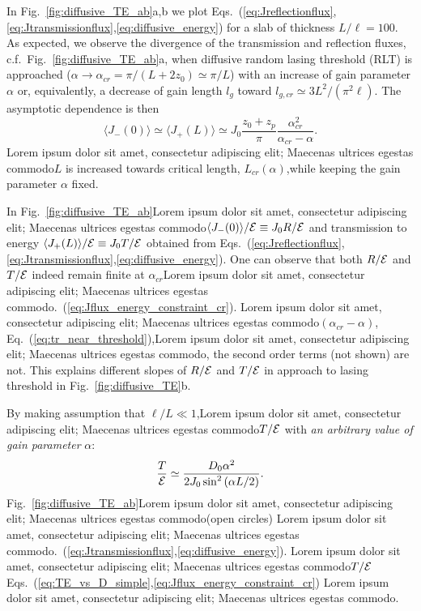 In Fig.~\ref{fig:diffusive_TE_ab}a,b we plot Eqs.~(\ref{eq:Jreflectionflux},\ref{eq:Jtransmissionflux},\ref{eq:diffusive_energy}) for a slab of thickness $L/\ell=100$. As expected, we observe the divergence of the transmission and reflection fluxes, c.f.~Fig.~\ref{fig:diffusive_TE_ab}a, when diffusive random lasing threshold (RLT) is approached ($\alpha\rightarrow\alpha_{cr}=\pi/(L+2z_0)\simeq \pi/L$) with an increase of gain parameter $\alpha$ or, equivalently, a decrease of gain length $l_g$ toward $l_{g,cr}\simeq 3L^2/(\pi^2\ell)$. The asymptotic dependence is then
\begin{equation}
\langle J_- (0)\rangle \simeq \langle J_+ (L)\rangle \simeq J_0\frac{z_0 +
z_p}{\pi} \frac{\alpha_{cr} ^2}{\alpha_{cr} -\alpha}.
\label{eq:tr_near_threshold}
\end{equation}
Lorem ipsum dolor sit amet, consectetur adipiscing elit; Maecenas ultrices egestas commodo$L$ is increased towards critical length, $L_{cr}(\alpha)$,while keeping the gain parameter $\alpha$ fixed.

In Fig.~\ref{fig:diffusive_TE_ab}Lorem ipsum dolor sit amet, consectetur adipiscing elit; Maecenas ultrices egestas commodo$\langle J_- (0)\rangle /{\cal E}\equiv J_0R/{\cal E}$ and transmission to energy $\langle J_+ (L)\rangle /{\cal E}\equiv J_0T/{\cal E}$ obtained from Eqs.~(\ref{eq:Jreflectionflux},\ref{eq:Jtransmissionflux},\ref{eq:diffusive_energy}). One can observe that both $R/{\cal E}$ and $T/{\cal E}$ indeed remain finite at $\alpha_{cr}$Lorem ipsum dolor sit amet, consectetur adipiscing elit; Maecenas ultrices egestas commodo.~(\ref{eq:Jflux_energy_constraint_cr}). Lorem ipsum dolor sit amet, consectetur adipiscing elit; Maecenas ultrices egestas commodo$(\alpha_{cr} -\alpha )$, Eq.~(\ref{eq:tr_near_threshold}),Lorem ipsum dolor sit amet, consectetur adipiscing elit; Maecenas ultrices egestas commodo, the second order terms (not shown) are not. This explains different slopes of $R/{\cal E}$ and $T/{\cal E}$ in approach to lasing threshold in Fig.~\ref{fig:diffusive_TE}b.

By making assumption that $\ell/L\ll 1$,Lorem ipsum dolor sit amet, consectetur adipiscing elit; Maecenas ultrices egestas commodo$T/{\cal E}$ with {\it an arbitrary value of gain parameter} $\alpha$: 
\begin{equation}
\frac{T}{{\cal E}} \simeq \displaystyle\frac{D_0\alpha^2}{2J_0\sin^2\left(\alpha L/2\right)}.
\label{eq:TE_analytical}
\end{equation}
Fig.~\ref{fig:diffusive_TE_ab}Lorem ipsum dolor sit amet, consectetur adipiscing elit; Maecenas ultrices egestas commodo(open circles) Lorem ipsum dolor sit amet, consectetur adipiscing elit; Maecenas ultrices egestas commodo.~(\ref{eq:Jtransmissionflux},\ref{eq:diffusive_energy}). Lorem ipsum dolor sit amet, consectetur adipiscing elit; Maecenas ultrices egestas commodo$T/{\cal E}$ Eqs.~(\ref{eq:TE_vs_D_simple},\ref{eq:Jflux_energy_constraint_cr}) Lorem ipsum dolor sit amet, consectetur adipiscing elit; Maecenas ultrices egestas commodo.


